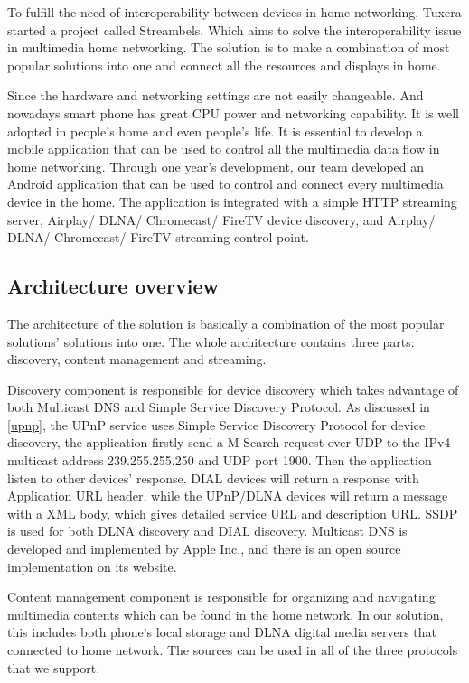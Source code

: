 
To fulfill the need of interoperability between devices in home networking,
Tuxera started a project called Streambels. Which aims to solve the
interoperability issue in multimedia home networking. The solution is to make a
combination of most popular solutions into one and connect all the resources
and displays in home. 

Since the hardware and networking settings are not easily changeable. And
nowadays smart phone has great CPU power and networking capability. It is well
adopted in people's home and even people's life. It is essential to develop a
mobile application that can be used to control all the multimedia data flow in
home networking. Through one year's development, our team developed an Android
application that can be used to control and connect every multimedia device in
the home. The application is integrated with a simple HTTP streaming server,
Airplay/ DLNA/ Chromecast/ FireTV device discovery, and
Airplay/ DLNA/ Chromecast/ FireTV streaming control point.

\subsection{Architecture overview}
The architecture of the solution is basically a combination of the most popular
solutions' solutions into one. The whole architecture contains three parts:
discovery, content management and streaming. 

Discovery component is responsible for device discovery which takes advantage of
both Multicast DNS and Simple Service Discovery Protocol. As discussed in
\ref{upnp}, the UPnP service uses Simple Service Discovery Protocol for device
discovery, the application firstly send a M-Search request over UDP to the
IPv4 multicast address 239.255.255.250 and UDP port 1900. Then the application
listen to other devices' response. DIAL devices will return a response with
Application URL header, while the UPnP/DLNA devices will return a message with
a XML body, which gives detailed service URL and description URL. SSDP is used
for both DLNA discovery and DIAL discovery. Multicast DNS is developed and
implemented by Apple Inc., and there is an open source implementation on its
website.

Content management component is responsible for organizing and
navigating multimedia contents which can be found in the home network. In our
solution, this includes both phone's local storage and DLNA digital media
servers that connected to home network. The sources can be used in all of the
three protocols that we support.

